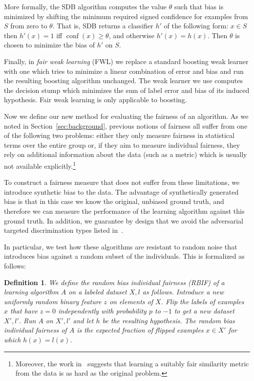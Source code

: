 \documentclass[conference]{IEEEtran}
\DeclareMathOperator{\conf}{conf}
\newtheorem{definition}{Definition}
\begin{document}
More formally, the SDB algorithm computes the value $\theta$ such that bias is
minimized by shifting the minimum required signed confidence for examples from
$S$ from zero to $\theta$. That is, SDB returns a classifier $h'$ of the following form: $x \in S$ then $h'(x) = 1$ iff $\conf(x)
\ge \theta$, and otherwise $h'(x) = h(x)$.  Then $\theta$ is chosen to minimize the bias of $h'$ on $S$.

Finally, in \emph{fair weak learning} (FWL) we replace a standard boosting weak
learner with one which tries to minimize a linear combination of error and bias
and run the resulting boosting algorithm unchanged. The weak learner we use
computes the decision stump which minimizes the sum of label error and bias of
its induced hypothesis. Fair weak learning is only applicable to boosting.

Now we define our new method for evaluating the fairness of an algorithm.  As
we noted in Section~\ref{sec:background}, previous notions of fairness all
suffer from one of the following two problems: either they only measure
fairness in statistical terms over the entire group or, if they aim to measure
individual fairness, they rely on additional information about the data (such
as a metric) which is usually not available explicitly.\footnote{Moreover, the
work in~\cite{DworkHPR12} suggests that learning a suitably fair similarity
metric from the data is as hard as the original problem.}

To construct a fairness measure that does not suffer from these limitations, we
introduce synthetic bias to the data. The advantage of synthetically generated
bias is that in this case we know the original, unbiased ground truth, and
therefore we can measure the performance of the learning algorithm against this
ground truth. In addition, we guarantee by design that we avoid the adversarial
targeted discrimination types listed in~\cite{DworkHPR12}.

In particular, we test how these algorithms are resistant to random noise that
introduces bias against a random subset of the individuals.  This is formalized
as follows:

\begin{definition}
We define the \emph{random bias individual fairness} (RBIF) of a learning
algorithm $A$ on a labeled dataset $X,l$ as follows. Introduce a new uniformly
random binary feature $z$ on elements of $X$. Flip the labels of examples $x$
that have $z=0$ independently with probability $p$ to $-1$ to get a new dataset
$X', l'$. Run $A$ on $X', l'$ and let $h$ be the resulting hypothesis. The
random bias individual fairness of $A$ is the expected fraction of flipped
examples $x \in X'$ for which $h(x) = l(x)$.  
\end{definition}
\end{document}
